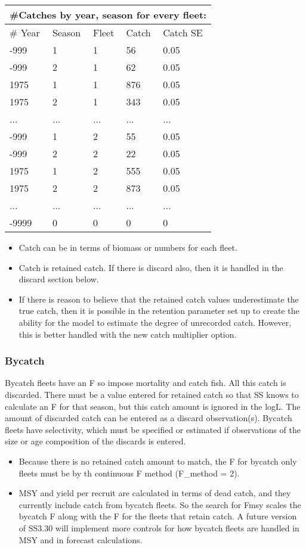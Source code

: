 \begin{center}
	\begin{tabular}{p{3cm} p{3cm} p{3cm} p{3cm} p{2cm}}
		\multicolumn{5}{l}{\#Catches by year, season for every fleet:}\\
		\hline
		\# Year & Season & Fleet & Catch & Catch SE \\
		\hline
		-999 & 1 & 1 & 56  & 0.05 \\
		-999 & 2 & 1 & 62  & 0.05 \\
		1975 & 1 & 1 & 876 & 0.05 \\
		1975 & 2 & 1 & 343 & 0.05 \\
		...  & ...   & ...   & ...   & ...  \\
		-999 & 1 & 2 & 55  & 0.05 \\
		-999 & 2 & 2 & 22  & 0.05 \\
		1975 & 1 & 2 & 555 & 0.05 \\
		1975 & 2 & 2 & 873 & 0.05 \\
		...  & ...   & ...   & ...   & ...  \\
		-9999 & 0 & 0 & 0 & 0 \\
		\hline
	\end{tabular}
\end{center}

\begin{itemize}
	\item Catch can be in terms of biomass or numbers for each fleet.
	\item Catch is retained catch. If there is discard also, then it is handled in the discard section below.
	\item If there is reason to believe that the retained catch values underestimate the true catch, then it is possible in the retention parameter set up to create the ability for the model to estimate the degree of unrecorded catch.  However, this is better handled with the new catch multiplier option.
\end{itemize}
\subsubsection{Bycatch}
Bycatch fleets have an F so impose mortality and catch fish.  All this catch is discarded.  There must be a value entered for retained catch so that SS knows to calculate an F for that season, but this catch amount is ignored in the logL.  The amount of discarded catch can be entered as a discard observation(s).  Bycatch fleets have selectivity, which must be specified or estimated if observations of the size or age composition of the discards is entered.
\begin{itemize}
	\item Because there is no retained catch amount to match, the F for bycatch only fleets must be by th continuous F method  (F\_method = 2).
	\item  MSY and yield per recruit are calculated in terms of dead catch, and they currently include catch from bycatch fleets.  So the search for Fmsy scales the bycatch F along with the F for the fleets that retain catch.  A future version of SS3.30 will implement more controls for how bycatch fleets are handled in MSY and in forecast calculations. 
\end{itemize}

